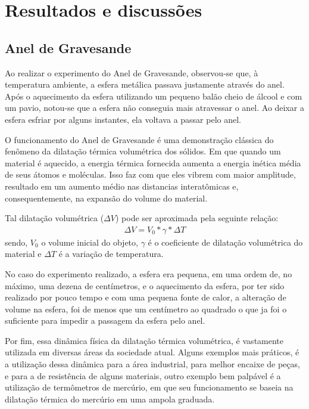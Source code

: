 \section{Resultados e discussões}


\subsection{Anel de Gravesande}
Ao realizar o experimento do Anel de Gravesande, observou-se que, à temperatura ambiente, a esfera metálica passava justamente através do anel. Após o aquecimento da esfera utilizando um pequeno balão cheio de álcool e com um pavio, notou-se que a esfera não conseguia mais atravessar o anel. Ao deixar a esfera esfriar por alguns instantes, ela voltava a passar pelo anel.

O funcionamento do Anel de Gravesande é uma demonstração clássica do fenômeno da dilatação térmica volumétrica dos sólidos. Em que quando um material é aquecido, a energia térmica fornecida aumenta a energia inética média de seus átomos e moléculas. Isso faz com que eles vibrem com maior amplitude, resultado em um aumento médio nas distancias interatômicas e, consequentemente, na expansão do volume do material.

Tal dilatação volumétrica (\(\Delta V\)) pode ser aproximada pela seguinte relação:
\begin{align*}
	\Delta V = V_0 * \gamma * \Delta T
\end{align*}
sendo, \(V_0\) o volume inicial do objeto, \(\gamma\) é o coeficiente de dilatação volumétrica do material e \(\Delta T\) é a variação de temperatura.

No caso do experimento realizado, a esfera era pequena, em uma ordem de, no máximo, uma dezena de centímetros, e o aquecimento da esfera, por ter sido realizado por pouco tempo e com uma pequena fonte de calor, a alteração de volume na esfera, foi de menos que um centímetro ao quadrado o que ja foi o suficiente para impedir a passagem da esfera pelo anel.

Por fim, essa dinâmica física da dilatação térmica  volumétrica, é vastamente utilizada em diversas áreas da sociedade atual. Alguns exemplos mais práticos, é a utilização dessa dinâmica para a área industrial, para melhor encaixe de peças, e para a de resistência de alguns materiais, outro exemplo bem palpável é a utilização de termômetros de mercúrio, em que seu funcionamento se baseia na dilatação térmica do mercúrio em uma ampola graduada.  

